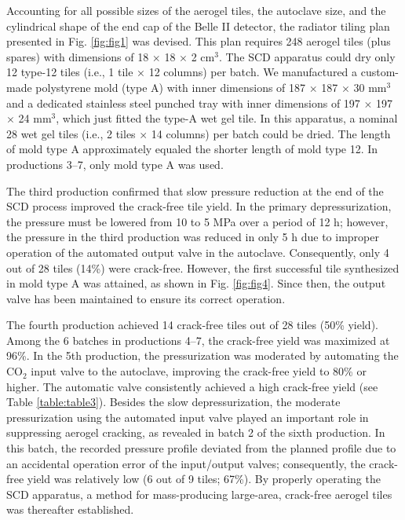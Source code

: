 \documentclass[5p,twocolumn]{elsarticle}
\begin{document}
Accounting for all possible sizes of the aerogel tiles, the autoclave size, and the cylindrical shape of the end cap of the Belle II detector, the radiator tiling plan presented in Fig. \ref{fig:fig1} was devised. This plan requires 248 aerogel tiles (plus spares) with dimensions of 18 $\times $ 18 $\times $ 2 cm$^3$. The SCD apparatus could dry only 12 type-12 tiles (i.e., 1 tile × 12 columns) per batch. We manufactured a custom-made polystyrene mold (type A) with inner dimensions of 187 $\times $ 187 $\times $ 30 mm$^3$ and a dedicated stainless steel punched tray with inner dimensions of 197 $\times $ 197 $\times $ 24 mm$^3$, which just fitted the type-A wet gel tile. In this apparatus, a nominal 28 wet gel tiles (i.e., 2 tiles $\times $ 14 columns) per batch could be dried. The length of mold type A approximately equaled the shorter length of mold type 12. In productions 3--7, only mold type A was used.

The third production confirmed that slow pressure reduction at the end of the SCD process improved the crack-free tile yield. In the primary depressurization, the pressure must be lowered from 10 to 5 MPa over a period of 12 h; however, the pressure in the third production was reduced in only 5 h due to improper operation of the automated output valve in the autoclave. Consequently, only 4 out of 28 tiles (14\%) were crack-free. However, the first successful tile synthesized in mold type A was attained, as shown in Fig. \ref{fig:fig4}. Since then, the output valve has been maintained to ensure its correct operation.

The fourth production achieved 14 crack-free tiles out of 28 tiles (50\% yield). Among the 6 batches in productions 4--7, the crack-free yield was maximized at 96\%. In the 5th production, the pressurization was moderated by automating the CO$_2$ input valve to the autoclave, improving the crack-free yield to 80\% or higher. The automatic valve consistently achieved a high crack-free yield (see Table \ref{table:table3}). Besides the slow depressurization, the moderate pressurization using the automated input valve played an important role in suppressing aerogel cracking, as revealed in batch 2 of the sixth production. In this batch, the recorded pressure profile deviated from the planned profile due to an accidental operation error of the input/output valves; consequently, the crack-free yield was relatively low (6 out of 9 tiles; 67\%). By properly operating the SCD apparatus, a method for mass-producing large-area, crack-free aerogel tiles was thereafter established.
\end{document}
